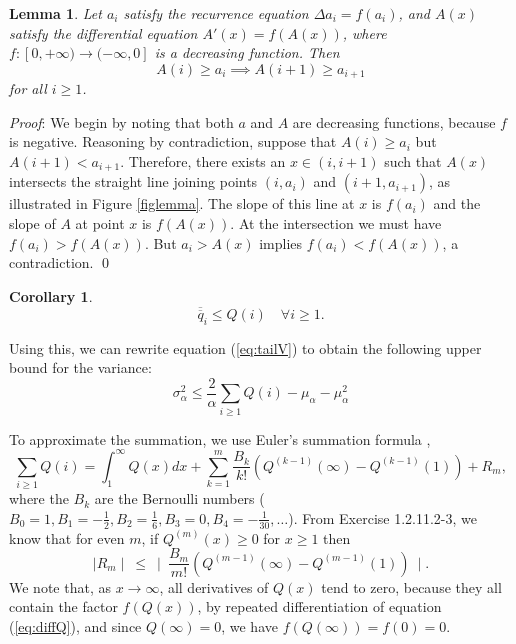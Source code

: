 \documentclass[proceedings]{aofa}
\newtheorem{lemma}{Lemma}
\newtheorem{corollary}{Corollary}
\newcommand{\tail}[1]{\overline{#1}}
\newcommand{\ttail}[1]{\tail{\tail{#1}}}
\begin{document}
\begin{lemma}\label{lemma:boundQ}
Let $a_i$ satisfy the recurrence equation $\Delta a_{i}=f(a_i)$, and $A(x)$ satisfy the differential equation $A'(x)=f(A(x))$, where $f: [0,+\infty) \rightarrow (-\infty,0]$ is a decreasing function.
Then
\begin{equation}
A(i)\ge a_i \implies  A(i+1)\ge a_{i+1}
\end{equation}
for all $i\ge 1$.
\end{lemma}
{\em Proof\/}:
We begin by noting that both $a$ and $A$ are decreasing functions, because $f$ is negative.
Reasoning by contradiction, suppose that $A(i)\ge a_i$ but $A(i+1)<a_{i+1}$. Therefore, there exists an $x \in (i,i+1)$ such that $A(x)$ intersects the straight line joining points $(i,a_i)$ and $(i+1,a_{i+1})$, as illustrated in Figure \ref{figlemma}.
The slope of this line at $x$ is $f(a_i)$ and the slope of $A$ at point $x$ is $f(A(x))$. At the intersection we must have $f(a_i)>f(A(x))$. But $a_i>A(x)$ implies $f(a_i)<f(A(x))$, a contradiction.
\qed

\begin{corollary}
\begin{equation}
\ttail{q}_i \le Q(i) \quad \forall i \ge 1.
\end{equation}
\end{corollary}

Using this, we can rewrite equation (\ref{eq:tailV}) to obtain the following upper bound for the variance:
\begin{equation}\label{eq:boundtailV}
\sigma_{\alpha}^2 
\le \frac{2}{\alpha} \sum_{i\ge 1} Q(i) - \mu_{\alpha} - \mu_{\alpha}^2
\end{equation}


To approximate the summation, we use Euler's summation formula \cite{Knuth1},
\begin{equation}
\sum_{i\ge 1} Q(i) = \int_1^{\infty} Q(x)dx +
\sum_{k = 1}^m
\frac{B_k}{k!}(Q^{(k-1)}(\infty)-Q^{(k-1)}(1)) + R_m,
\end{equation}
where the $B_k$ are the Bernoulli numbers ($B_0=1, B_1=-\frac12, B_2=\frac16,
B_3=0, B_4=-\frac{1}{30}, \ldots$). From \cite{Knuth1} Exercise 1.2.11.2-3, we know that for even $m$, if  $Q^{(m)}(x) \geq 0$ for $x \ge 1$ then
\begin{equation}
\mid R_m\mid~\leq~\mid~\frac{B_m}{m!}(Q^{(m-1)}(\infty)-Q^{(m-1)}(1)) ~\mid.
\end{equation}
We note that, as $x \rightarrow \infty$, all derivatives of $Q(x)$ tend to zero, because they all contain the factor $f(Q(x))$, by repeated differentiation of equation (\ref{eq:diffQ}), and since $Q(\infty)=0$, we have $f(Q(\infty))=f(0)=0$.
\end{document}
